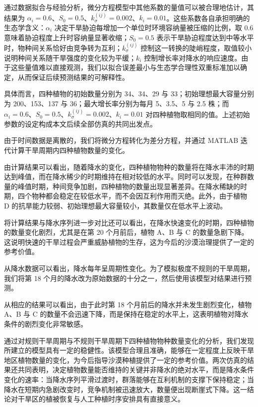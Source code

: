 \documentclass[11pt,a4paper]{ctexart}
\begin{document}
通过数据拟合与经验分析，微分方程模型中其他系数的量值可以被合理地估计，其结果为 $\alpha_i=0.6$、$S_0=0.5$、$k^{(ij)}_{\sigma}=0.002$、$k_i=0.01$。这些系数各自承担明确的生态学含义：$\alpha_i$ 决定干旱胁迫每增加一个单位时环境容纳量被压缩的比例，取 0.6 意味着胁迫程度上升时容纳量显著收缩；$S_0=0.5$ 表示干旱胁迫程度达到中等水平时，物种间关系恰好由竞争转为互利；$k^{(ij)}_{\sigma}$ 控制这一转换的陡峭程度，取值较小说明种间关系随干旱强度的变化较为平缓；$k_i$ 控制增长率对降水的响应速度。由于这些量值难以直接观测，我们以拟合误差最小与生态学合理性双重标准加以确定，从而保证后续预测结果的可解释性。

具体而言，四种植物的初始数量分别为 34、34、29 与 33；初始理想最大容量分别为 200、153、137 与 36；最大增长率分别为每月 5、3.5、5 与 2.5 株；而 $\alpha_i=0.6$、$S_0=0.5$、$k^{(ij)}_{\sigma}=0.002$、$k_i=0.01$ 对四种植物取相同的值。上述初始参数的设定构成本文后续全部仿真的共同出发点。

由于时间数据是离散的，我们将微分方程转化为差分方程，并通过 MATLAB 迭代计算干旱周期内四种植物数量的变化。

由计算结果可以看出，随着降水的变化，四种植物物种的数量将在降水丰沛的时期达到峰值，而在降水稀少的时期维持在相对较低的水平。同时可以发现，在种群数量的峰值时期，种间竞争加剧，四种植物的数量出现显著差异。在降水稀缺的时期，四个物种都会稳定在较低水平，而不会因互利作用而灭绝。此外，由于植物 D 的抗旱能力较弱、初始理想最大容量较小，其数量仅在低水平上波动。

将计算结果与降水序列进一步对比还可以看出，在降水快速变化的时期，四种植物的数量变化剧烈，尤其是在第 20 个月前后，植物 A、B 与 C 的数量急剧下降。这说明快速的干旱过程会严重威胁植物的生存，这为今后的沙漠治理提供了一定的参考价值。

从降水数据可以看出，降水每年呈周期性变化。为了模拟极度不规则的干旱周期，我们将第 18 个月的降水改为原始数据的十分之一，然后使用该模型对结果进行预测。

从相应的结果可以看出，由于此时第 18 个月前后的降水并未发生剧烈变化，植物 A、B 与 C 的数量不会迅速下降，而是保持在稳定的水平上，这表明植物对降水条件的剧烈变化非常敏感。

通过对规则干旱周期与不规则干旱周期下四种植物物种数量变化的分析，我们发现所建立的模型具有一定的稳健性。该模型合理且准确，能够在一定程度上反映干旱地区植物数量的变化，为今后指导沙漠种植提供了一定的参考价值。两次仿真的结果还共同表明，决定植物数量能否维持的关键并非降水的绝对水平，而是降水条件变化的速率：当降水序列平滑过渡时，群落能够在互利机制的支撑下保持稳定；当降水在短期内急剧改变时，竞争机制被迅速放大，数量便出现断崖式下降。这一结论对干旱区的植被恢复与人工种植时序安排具有直接意义。
\end{document}

